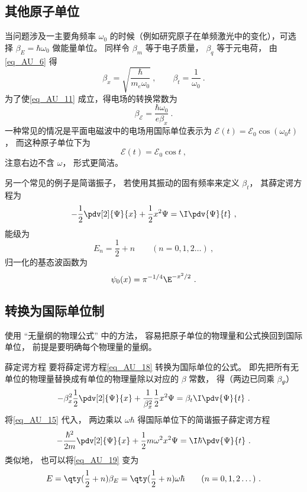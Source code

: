 \subsection{其他原子单位}

当问题涉及一主要角频率 $\omega_0$ 的时候（例如研究原子在单频激光中的变化），可选择 $\beta_E = \hbar\omega_0$ 做能量单位。 同样令 $\beta_m$ 等于电子质量， $\beta_q$ 等于元电荷， 由\autoref{eq_AU_6} 得
\begin{equation}\label{eq_AU_15}
\beta_x = \sqrt{\frac{\hbar}{m_e\omega_0}}~,
\qquad
\beta_t = \frac{1}{\omega_0}~.
\end{equation}
为了使\autoref{eq_AU_11} 成立，得电场的转换常数为
\begin{equation}
\beta_\mathcal{E} = \frac{\hbar\omega_0}{e \beta_x}~.
\end{equation}
一种常见的情况是平面电磁波中的电场用国际单位表示为 $\mathcal{E}(t) = \mathcal{E}_0\cos(\omega_0 t)$， 而这种原子单位下为
\begin{equation}
\mathcal{E}(t) = \mathcal{E}_0\cos t~,
\end{equation}
注意右边不含 $\omega$， 形式更简洁。

另一个常见的例子是简谐振子， 若使用其振动的固有频率来定义 $\beta_t$， 其薛定谔方程为
\begin{equation}\label{eq_AU_18}
-\frac12 \pdv[2]{\Psi}{x} + \frac12 x^2 \Psi= \I\pdv{\Psi}{t}~,
\end{equation}
能级为
\begin{equation}\label{eq_AU_19}
E_n = \frac12 + n \qquad (n = 0, 1, 2\dots)~,
\end{equation}
归一化的基态波函数为
\begin{equation}
\psi_0(x) = \pi^{-1/4} \E^{-x^2/2}~.
\end{equation}


\subsection{转换为国际单位制}
使用 “无量纲的物理公式” 中的方法， 容易把原子单位的物理量和公式换回到国际单位， 前提是要明确每个物理量的量纲。

\begin{example}{薛定谔方程}
要将薛定谔方程\autoref{eq_AU_18} 转换为国际单位的公式。 即先把所有无单位的物理量替换成有单位的物理量除以对应的 $\beta$ 常数， 得（两边已同乘 $\beta_\Psi$）
\begin{equation}
-\beta_x^2\frac12 \pdv[2]{\Psi}{x} + \frac{1}{\beta_x^2}\frac12 x^2 \Psi= \beta_t\I\pdv{\Psi}{t}~.
\end{equation}
将\autoref{eq_AU_15} 代入， 两边乘以 $\omega\hbar$ 得国际单位下的简谐振子薛定谔方程
\begin{equation}
-\frac{\hbar^2}{2m} \pdv[2]{\Psi}{x} + \frac12 m\omega^2 x^2 \Psi= \I\hbar\pdv{\Psi}{t}~.
\end{equation}
类似地， 也可以将\autoref{eq_AU_19} 变为
\begin{equation}
E =  \qty(\frac12 + n)\beta_E = \qty(\frac12 + n)\omega\hbar \qquad (n = 0, 1, 2\dots)~.
\end{equation}
\end{example}
